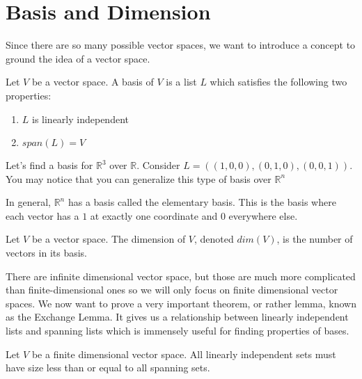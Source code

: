 \section{Basis and Dimension}
Since there are so many possible vector spaces, we want to introduce a concept to ground the idea of a vector space.
\begin{definition}
    Let $V$ be a vector space. A basis of $V$ is a list $L$ which satisfies the following two properties:
    \begin{enumerate}
        \item $L$ is linearly independent
        \item $span(L)=V$
    \end{enumerate}
\end{definition}
\begin{example}
    Let's find a basis for $\mathbb{R}^3$ over $\mathbb{R}$. Consider $L=((1,0,0),(0,1,0),(0,0,1))$. You may notice that you can generalize this type of basis over $\mathbb{R}^n$
\end{example}
\begin{remark}
    In general, $\mathbb{R}^n$ has a basis called the elementary basis. This is the basis where each vector has a $1$ at exactly one coordinate and $0$ everywhere else.
\end{remark}
\begin{definition}
    Let $V$ be a vector space. The dimension of $V$, denoted $dim(V)$, is the number of vectors in its basis.
\end{definition}
There are infinite dimensional vector space, but those are much more complicated than finite-dimensional ones so we will only focus on finite dimensional vector spaces. We now want to prove a very important theorem, or rather lemma, known as the Exchange Lemma. It gives us a relationship between linearly independent lists and spanning lists which is immensely useful for finding properties of bases.
\begin{theorem}
    Let $V$ be a finite dimensional vector space. All linearly independent sets must have size less than or equal to all spanning sets.
\end{theorem}
